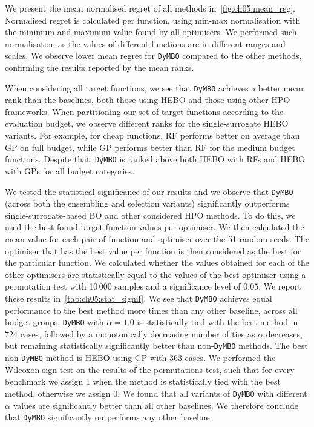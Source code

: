 We present the mean normalised regret of all methods in~\cref{fig:ch05:mean_reg}. Normalised regret is calculated per function, using min-max normalisation with the minimum and maximum value found by all optimisers. 
We performed such normalisation as the values of different functions are in different ranges and scales. We observe lower mean regret for \texttt{DyMBO} compared to the other methods, confirming the results reported by the mean ranks.

When considering all target functions, we see that \texttt{DyMBO} achieves a better mean rank than the baselines, both those using HEBO and those using other HPO frameworks. When partitioning our set of target functions according to the evaluation budget, we observe different ranks for the single-surrogate HEBO variants. For example, for cheap functions, RF performs better on average than GP on full budget, while GP performs better than RF for the medium budget functions. Despite that, \texttt{DyMBO} is ranked above both HEBO with RFs and HEBO with GPs for all budget categories.

We tested the statistical significance of our results 
and we observe that \texttt{DyMBO} (across both the ensembling and selection variants) 
significantly outperforms single-surrogate-based BO and other considered HPO methods. 
To do this, we used the best-found target function values per optimiser. 
We then calculated the mean value for each pair of function and optimiser over the 51 random seeds. 
The optimiser that has the best value per function is then considered as the best for the particular function. 
We calculated whether the values obtained for each of the other optimisers are statistically equal to the values of the best optimiser using a permutation test with 10\,000 samples and a significance level of $0.05$. 
We report these results in~\cref{tab:ch05:stat_signif}. 
We see that \texttt{DyMBO} achieves equal performance to the best method more times than any other baseline, across all budget groups. 
\texttt{DyMBO} with $\alpha = 1.0$ is statistically tied with the best method in 724 cases, followed by a monotonically decreasing number of ties as $\alpha$ decreases, but remaining statistically significantly better than non-\texttt{DyMBO} methods.
The best non-\texttt{DyMBO} method is HEBO using GP with 363 cases. We performed the Wilcoxon sign test on the results of the permutations test, such that for every benchmark we assign 1 when the method is statistically tied with the best method, otherwise we assign 0. We found that 
all variants of \texttt{DyMBO} with different $\alpha$ values are significantly better than all other baselines.
We therefore conclude that \texttt{DyMBO} significantly outperforms any other baseline.

